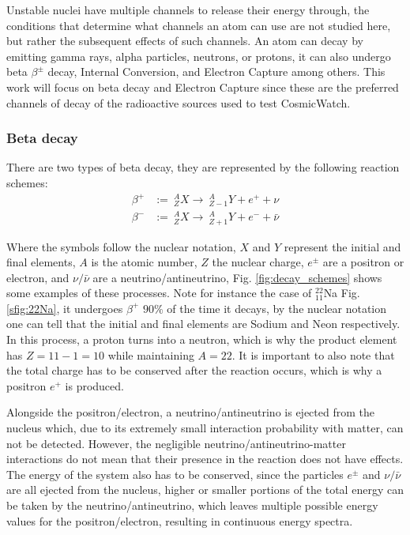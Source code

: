 Unstable nuclei have multiple channels to release their energy through, the conditions that determine what channels an atom can use are not studied here, but rather the subsequent effects of such channels. An atom can decay by emitting gamma rays, alpha particles, neutrons, or protons, it can also undergo beta $\beta^{\pm}$ decay, Internal Conversion, and Electron Capture among others. This work will focus on beta decay and Electron Capture since these are the preferred channels of decay of the radioactive sources used to test CosmicWatch.

\subsubsection{Beta decay}

There are two types of beta decay, they are represented by the following reaction schemes:
\begin{align}
  \beta^+ &:=~ ^A_ZX \rightarrow ~ ^A_{Z-1}Y + e^+ + \nu \\
  \beta^- &:=~ ^A_ZX \rightarrow ~ ^A_{Z+1}Y + e^- + \bar{\nu}
\end{align}

Where the symbols follow the nuclear notation, $X$ and $Y$ represent the initial and final elements, $A$ is the atomic number, $Z$ the nuclear charge, $e^{\pm}$ are a positron or electron, and $\nu/\bar{\nu}$ are a neutrino/antineutrino, Fig. \ref{fig:decay_schemes} shows some examples of these processes. Note for instance the case of $^{22}_{11}$Na Fig. \ref{sfig:22Na}, it undergoes $\beta^+$ $90\%$ of the time it decays, by the nuclear notation one can tell that the initial and final elements are Sodium and Neon respectively. In this process, a proton turns into a neutron, which is why the product element has $Z=11-1=10$ while maintaining $A=22$. It is important to also note that the total charge has to be conserved after the reaction occurs, which is why a positron $e^+$ is produced.

Alongside the positron/electron, a neutrino/antineutrino is ejected from the nucleus which, due to its extremely small interaction probability with matter, can not be detected. However, the negligible neutrino/antineutrino-matter interactions do not mean that their presence in the reaction does not have effects. The energy of the system also has to be conserved, since the particles $e^{\pm}$ and $\nu/\bar{\nu}$ are all ejected from the nucleus, higher or smaller portions of the total energy can be taken by the neutrino/antineutrino, which leaves multiple possible energy values for the positron/electron, resulting in continuous energy spectra.

